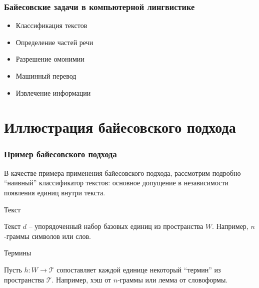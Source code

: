 \documentclass{beamer}
\newcommand{\Tcal}{\mathcal{T}}
\begin{document}
\begin{frame}\frametitle{Байесовские задачи в компьютерной лингвистике}

  \begin{block}

  \begin{itemize}
    \item Классификация текстов
    \item Определение частей речи
    \item Разрешение омонимии
    \item Машинный перевод
    \item Извлечение информации
  \end{itemize}
  \end{block}
\end{frame}


\section{Иллюстрация байесовского подхода} %
\label{sec:bayes_demonstration}
\begin{frame}\frametitle{Пример байесовского подхода}
  \begin{block}

    В качестве примера применения байесовского подхода, рассмотрим подробно ``наивный'' классификатор текстов: основное допущение в независимости появления единиц внутри текста.
  \end{block}
  \begin{block}{Текст}

    Текст $d$ -- упорядоченный набор базовых единиц из пространства $W$.
    Например, $n$-граммы символов или слов.
  \end{block}
  \begin{block}{Термины}

    Пусть $h:W\to \Tcal$ сопоставляет каждой единице некоторый ``термин'' из пространства $\Tcal$. Например, хэш от $n$-граммы или лемма от словоформы.
  \end{block}
\end{frame}
\end{document}
